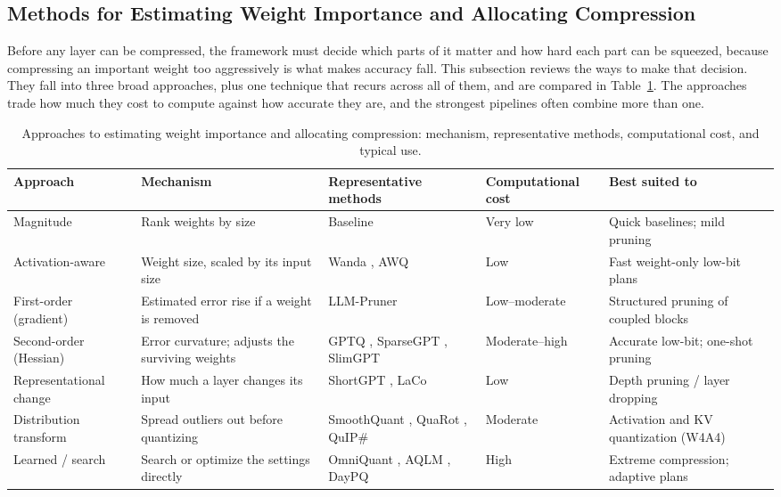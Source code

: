 \subsection{Methods for Estimating Weight Importance and Allocating Compression}

Before any layer can be compressed, the framework must decide which parts of it matter and how hard each part can be squeezed, because compressing an important weight too aggressively is what makes accuracy fall. This subsection reviews the ways to make that decision. They fall into three broad approaches, plus one technique that recurs across all of them, and are compared in Table~\ref{tab:lr-importance}. The approaches trade how much they cost to compute against how accurate they are, and the strongest pipelines often combine more than one.

\begin{table}[htbp]
\centering
\scriptsize
\caption{Approaches to estimating weight importance and allocating compression: mechanism, representative methods, computational cost, and typical use.}
\label{tab:lr-importance}
\renewcommand{\arraystretch}{1.2}
\begin{tabular}{p{}p{}p{}p{}p{}}
\hline
\textbf{Approach} & \textbf{Mechanism} & \textbf{Representative methods} & \textbf{Computational cost} & \textbf{Best suited to} \\
\hline
Magnitude & Rank weights by size & Baseline & Very low & Quick baselines; mild pruning \\
Activation-aware & Weight size, scaled by its input size & Wanda \cite{sun2024wanda}, AWQ \cite{lin2024awq} & Low & Fast weight-only low-bit plans \\
First-order (gradient) & Estimated error rise if a weight is removed & LLM-Pruner \cite{ma2023llmpruner} & Low--moderate & Structured pruning of coupled blocks \\
Second-order (Hessian) & Error curvature; adjusts the surviving weights & GPTQ \cite{frantar2023gptq}, SparseGPT \cite{frantar2023sparsegpt}, SlimGPT \cite{ling2024slimgpt} & Moderate--high & Accurate low-bit; one-shot pruning \\
Representational change & How much a layer changes its input & ShortGPT \cite{men2024shortgpt}, LaCo \cite{yang2024laco} & Low & Depth pruning / layer dropping \\
Distribution transform & Spread outliers out before quantizing & SmoothQuant \cite{xiao2023smoothquant}, QuaRot \cite{ashkboos2024quarot}, QuIP\# \cite{tseng2024quipsharp} & Moderate & Activation and KV quantization (W4A4) \\
Learned / search & Search or optimize the settings directly & OmniQuant \cite{shao2024omniquant}, AQLM \cite{egiazarian2024aqlm}, DayPQ \cite{xu2026daypq} & High & Extreme compression; adaptive plans \\
\hline
\end{tabular}
\end{table}

